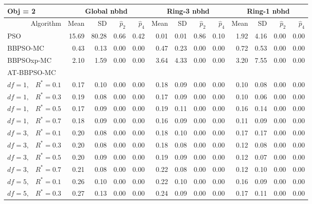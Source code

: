 \documentclass[12pt]{article}
\begin{document}
\begin{table}[ht]
\centering
\footnotesize{
\begin{tabular}{r|rrrr|rrrr|rrrr}
\multicolumn{1}{l}{Obj = 2} & \multicolumn{4}{c}{Global nbhd} & \multicolumn{4}{c}{Ring-3 nbhd} & \multicolumn{4}{c}{Ring-1 nbhd}\\
  \hline
Algorithm & Mean & SD & $\widehat{p}_2$ & $\widehat{p}_4$ & Mean & SD & $\widehat{p}_2$ & $\widehat{p}_4$ & Mean & SD & $\widehat{p}_2$ & $\widehat{p}_4$ \\ 
  \hline
\multicolumn{1}{l|}{PSO} & 15.69 & 80.28 & 0.66 & 0.42 & 0.01 & 0.01 & 0.86 & 0.10 & 1.92 & 4.16 & 0.00 & 0.00 \\ 
  \multicolumn{1}{l|}{BBPSO-MC} & 0.43 & 0.13 & 0.00 & 0.00 & 0.47 & 0.23 & 0.00 & 0.00 & 0.72 & 0.53 & 0.00 & 0.00 \\ 
  \multicolumn{1}{l|}{BBPSOxp-MC} & 2.10 & 1.59 & 0.00 & 0.00 & 3.64 & 4.33 & 0.00 & 0.00 & 3.20 & 7.55 & 0.00 & 0.00 \\ 
\hline
\multicolumn{1}{l|}{AT-BBPSO-MC} &&&&&&&&&&&&\\
  $df = 1,\enspace$ $R^* =0.1$ & 0.17 & 0.10 & 0.00 & 0.00 & 0.18 & 0.09 & 0.00 & 0.00 & 0.10 & 0.08 & 0.00 & 0.00 \\ 
  $df = 1,\enspace$ $R^* =0.3$ & 0.19 & 0.08 & 0.00 & 0.00 & 0.17 & 0.09 & 0.00 & 0.00 & 0.10 & 0.06 & 0.00 & 0.00 \\ 
  $df = 1,\enspace$ $R^* =0.5$ & 0.17 & 0.09 & 0.00 & 0.00 & 0.19 & 0.11 & 0.00 & 0.00 & 0.16 & 0.14 & 0.00 & 0.00 \\ 
  $df = 1,\enspace$ $R^* =0.7$ & 0.18 & 0.09 & 0.00 & 0.00 & 0.16 & 0.09 & 0.00 & 0.00 & 0.11 & 0.09 & 0.00 & 0.00 \\ 
  $df = 3,\enspace$ $R^* =0.1$ & 0.20 & 0.08 & 0.00 & 0.00 & 0.18 & 0.10 & 0.00 & 0.00 & 0.17 & 0.17 & 0.00 & 0.00 \\ 
  $df = 3,\enspace$ $R^* =0.3$ & 0.20 & 0.08 & 0.00 & 0.00 & 0.18 & 0.08 & 0.00 & 0.00 & 0.12 & 0.08 & 0.00 & 0.00 \\ 
  $df = 3,\enspace$ $R^* =0.5$ & 0.20 & 0.09 & 0.00 & 0.00 & 0.19 & 0.09 & 0.00 & 0.00 & 0.12 & 0.07 & 0.00 & 0.00 \\ 
  $df = 3,\enspace$ $R^* =0.7$ & 0.21 & 0.08 & 0.00 & 0.00 & 0.22 & 0.08 & 0.00 & 0.00 & 0.12 & 0.10 & 0.00 & 0.00 \\ 
  $df = 5,\enspace$ $R^* =0.1$ & 0.26 & 0.10 & 0.00 & 0.00 & 0.22 & 0.10 & 0.00 & 0.00 & 0.16 & 0.09 & 0.00 & 0.00 \\ 
  $df = 5,\enspace$ $R^* =0.3$ & 0.27 & 0.13 & 0.00 & 0.00 & 0.24 & 0.09 & 0.00 & 0.00 & 0.17 & 0.11 & 0.00 & 0.00 \\ 

\end{tabular}}
\end{table}
\end{document}
